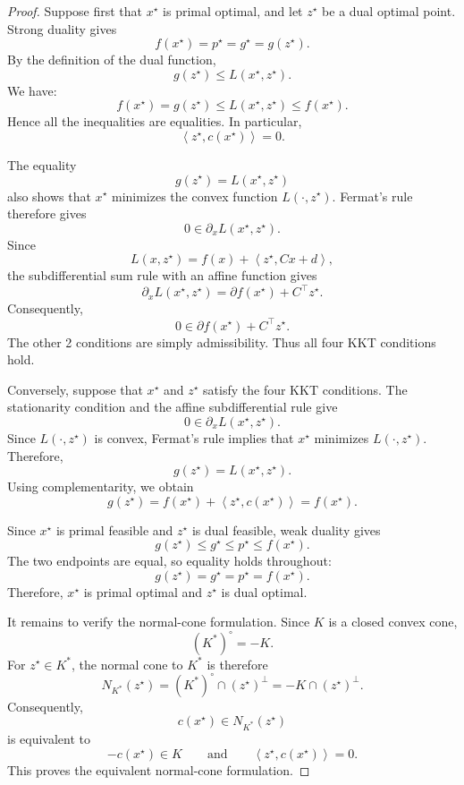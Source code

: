 \documentclass[a4paper,11pt]{book}
\theoremstyle{plain}
\theoremstyle{definition}
\theoremstyle{remark}
\numberwithin{equation}{chapter}
\numberwithin{algorithm}{chapter}
\newcommand{\inner}[2]{\left\langle #1, #2 \right\rangle}
\begin{document}
	\begin{proof}
		Suppose first that \(x^\star\) is primal optimal, and let \(z^\star\) be a
		dual optimal point. Strong duality gives
		\[
		f(x^\star)=p^\star=g^\star=g(z^\star).
		\]
		By the definition of the dual function,
		\[
		g(z^\star)\leq L(x^\star,z^\star).
		\]
		We have:
		\[
		f(x^\star)
		=
		g(z^\star)
		\leq
		L(x^\star,z^\star)
		\leq
		f(x^\star).
		\]
		Hence all the inequalities are equalities. In particular,
		\[
		\inner{z^\star}{c(x^\star)}=0.
		\]
		
		The equality
		\[
		g(z^\star)=L(x^\star,z^\star)
		\]
		also shows that \(x^\star\) minimizes the convex function
		\(L(\cdot,z^\star)\). Fermat's rule therefore gives
		\[
		0\in\partial_xL(x^\star,z^\star).
		\]
		Since
		\[
		L(x,z^\star)
		=
		f(x)+\inner{z^\star}{Cx+d},
		\]
		the subdifferential sum rule with an affine function gives
		\[
		\partial_xL(x^\star,z^\star)
		=
		\partial f(x^\star)+C^\top z^\star.
		\]
		Consequently,
		\[
		0\in\partial f(x^\star)+C^\top z^\star.
		\]
		The other 2 conditions are simply admissibility. Thus all four KKT conditions hold.
		
		Conversely, suppose that \(x^\star\) and \(z^\star\) satisfy the four KKT
		conditions. The stationarity condition and the affine subdifferential rule
		give
		\[
		0\in\partial_xL(x^\star,z^\star).
		\]
		Since \(L(\cdot,z^\star)\) is convex, Fermat's rule implies that
		\(x^\star\) minimizes \(L(\cdot,z^\star)\). Therefore,
		\[
		g(z^\star)=L(x^\star,z^\star).
		\]
		Using complementarity, we obtain
		\[
		g(z^\star)
		=
		f(x^\star)+\inner{z^\star}{c(x^\star)}
		=
		f(x^\star).
		\]
		
		Since \(x^\star\) is primal feasible and \(z^\star\) is dual feasible, weak
		duality gives
		\[
		g(z^\star)
		\leq
		g^\star
		\leq
		p^\star
		\leq
		f(x^\star).
		\]
		The two endpoints are equal, so equality holds throughout:
		\[
		g(z^\star)=g^\star=p^\star=f(x^\star).
		\]
		Therefore, \(x^\star\) is primal optimal and \(z^\star\) is dual optimal.
		
		It remains to verify the normal-cone formulation. Since \(K\) is a closed
		convex cone,
		\[
		(K^*)^\circ=-K.
		\]
		For \(z^\star\in K^*\), the normal cone to \(K^*\) is therefore
		\[
		N_{K^*}(z^\star)
		=
		(K^*)^\circ\cap(z^\star)^\perp
		=
		-K\cap(z^\star)^\perp.
		\]
		Consequently,
		\[
		c(x^\star)\in N_{K^*}(z^\star)
		\]
		is equivalent to
		\[
		-c(x^\star)\in K
		\qquad\text{and}\qquad
		\inner{z^\star}{c(x^\star)}=0.
		\]
		This proves the equivalent normal-cone formulation.
	\end{proof}
	
\end{document}
